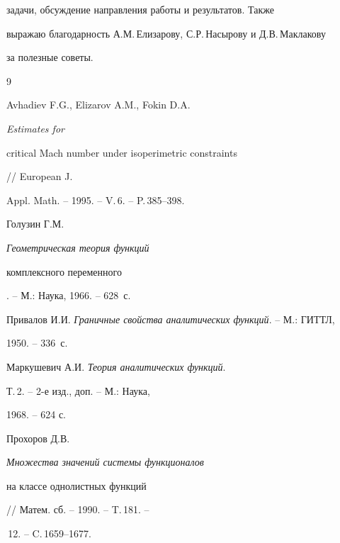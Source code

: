 задачи, обсуждение направления работы и результатов. Также


выражаю благодарность А.М.\,Елизарову, С.Р.\,Насырову и Д.В.\,Маклакову


за полезные советы.





\begin{thebibliography}{9}







Avhadiev F.G., Elizarov A.M., Fokin D.A. {\em Estimates for


critical Mach number under isoperimetric constraints} // European J.


Appl. Math. -- 1995. -- V.\,6. -- P.\,385--398.




Голузин Г.М. {\em Геометрическая теория функций


комплексного переменного}. -- М.: Наука, 1966. -- 628~с.




Привалов И.И. {\em Граничные свойства аналитических функций}. -- М.: ГИТТЛ,


1950. -- 336~с.




Маркушевич А.И. {\em Теория аналитических функций}.


Т.\,2. -- 2-е изд., доп. -- М.: Наука,


1968. -- 624 с.




Прохоров Д.В. {\em Множества значений системы функционалов


на классе однолистных функций} // Матем. сб. -- 1990. -- T.\,181. --


\No\,12. -- C.\,1659--1677.





\end{thebibliography}





\vskip 2cm












\label{end}





